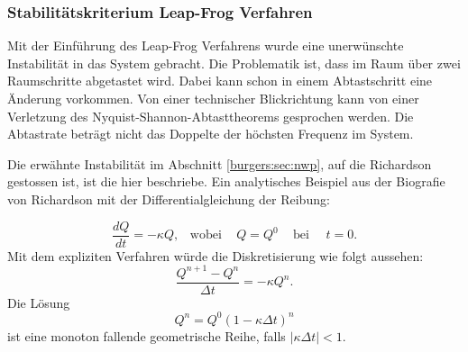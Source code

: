 \subsubsection{Stabilit\"atskriterium Leap-Frog Verfahren}
	Mit der Einf\"uhrung des Leap-Frog Verfahrens wurde eine unerw\"unschte Instabilit\"at in das System gebracht.
	Die Problematik ist, dass im Raum über zwei Raumschritte abgetastet wird.
	Dabei kann schon in einem Abtastschritt eine Änderung vorkommen.
	Von einer technischer Blickrichtung kann von einer Verletzung des Nyquist-Shannon-Abtasttheorems gesprochen werden.
	Die Abtastrate beträgt nicht das Doppelte der höchsten Frequenz im System.

	\medskip

	Die erw\"ahnte Instabilit\"at im Abschnitt \ref{burgers:sec:nwp}, auf die Richardson gestossen ist, ist die hier beschriebe.
%
	Ein analytisches Beispiel aus der Biografie von Richardson \cite{burgers:lynch_2014} mit der Differentialgleichung der Reibung:

	\begin{equation}
		\frac{dQ}{dt} = - \kappa Q, \,\,\,\,\, \text{wobei} \, \,\,\,\,\,\, Q=Q^0 \,\,\,\,\,\,\, \text{bei} \,\,\,\,\,\,\,\, t=0.
	\end{equation}
	Mit dem expliziten Verfahren w\"urde die Diskretisierung wie folgt aussehen:
	\begin{equation}
		\frac{Q^{n+1}-Q^n}{\Delta t} = - \kappa Q^n.
	\end{equation}
	Die L\"osung
		\begin{equation}
			Q^n = Q^0(1-\kappa \Delta t)^n
		\end{equation}
	ist eine monoton fallende geometrische Reihe, falls $|\kappa \Delta t| <1$.

